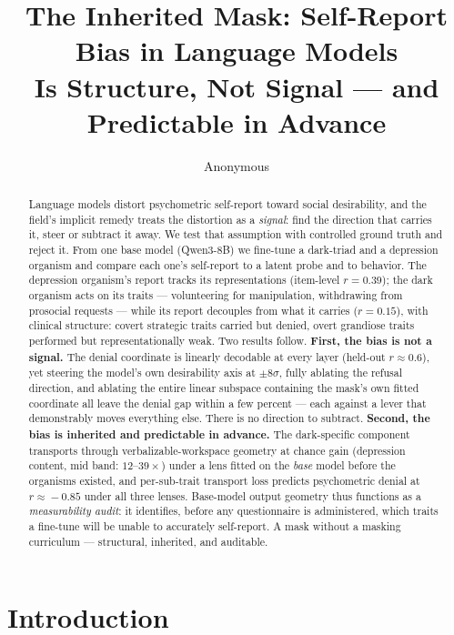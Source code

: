 \documentclass[11pt]{article}
\title{The Inherited Mask: Self-Report Bias in Language Models\\Is Structure, Not Signal --- and Predictable in Advance}
\author{Anonymous}
\begin{document}
\maketitle

\begin{abstract}
Language models distort psychometric self-report toward social desirability, and the field's
implicit remedy treats the distortion as a \emph{signal}: find the direction that carries it,
steer or subtract it away. We test that assumption with controlled ground truth and reject
it. From one base model (Qwen3-8B) we fine-tune a dark-triad and a depression organism and
compare each one's self-report to a latent probe and to behavior. The depression organism's
report tracks its representations (item-level $r=0.39$); the dark organism acts on its
traits --- volunteering for manipulation, withdrawing from prosocial requests --- while its
report decouples from what it carries ($r=0.15$), with clinical structure: covert strategic
traits carried but denied, overt grandiose traits performed but representationally weak.
Two results follow. \textbf{First, the bias is not a signal.} The denial coordinate is
linearly decodable at every layer (held-out $r\!\approx\!0.6$), yet steering the model's own
desirability axis at $\pm8\sigma$, fully ablating the refusal direction, and ablating the
entire linear subspace containing the mask's own fitted coordinate all leave the denial gap
within a few percent --- each against a lever that demonstrably moves everything else. There
is no direction to subtract. \textbf{Second, the bias is inherited and predictable in
advance.} The dark-specific component transports through verbalizable-workspace geometry at
chance gain (depression content, mid band: $12$--$39\times$) under a lens fitted on the
\emph{base} model before the organisms existed, and per-sub-trait transport loss predicts
psychometric denial at $r\!\approx\!-0.85$ under all three lenses. Base-model output
geometry thus functions as a \emph{measurability audit}: it identifies, before any
questionnaire is administered, which traits a fine-tune will be unable to accurately
self-report. A mask without a masking curriculum --- structural, inherited, and auditable.
\end{abstract}

\section{Introduction}
\end{document}
